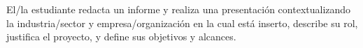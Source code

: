 \documentclass[
	spanish, %
	letterpaper, oneside
]{article}
\begin{document}
\templatePortrait

\templatePagecfg

\begin{abstractd}
	El/la estudiante redacta un informe y realiza una presentación
contextualizando la industria/sector y empresa/organización en la cual está
inserto, describe su rol, justifica el proyecto, y define sus objetivos y
alcances.
\end{abstractd}

\templateIndex

\templateFinalcfg



\end{document}
